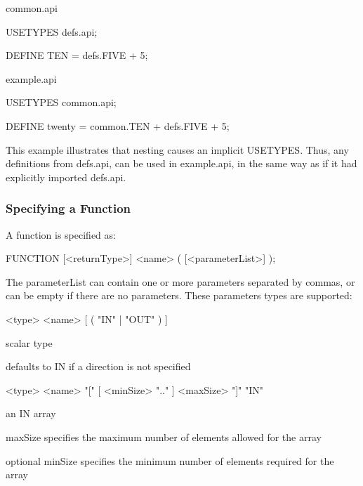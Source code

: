 common.\+api \begin{DoxyVerb}USETYPES defs.api;

DEFINE TEN = defs.FIVE + 5;
\end{DoxyVerb}


example.\+api \begin{DoxyVerb}USETYPES common.api;

DEFINE twenty = common.TEN + defs.FIVE + 5;
\end{DoxyVerb}


This example illustrates that nesting causes an implicit U\+S\+E\+T\+Y\+P\+E\+S. Thus, any definitions from defs.\+api, can be used in example.\+api, in the same way as if it had explicitly imported defs.\+api.\hypertarget{interface_def_lang_syntax_interfaceDefLangSyntax_function}{}\subsubsection{Specifying a Function}\label{interface_def_lang_syntax_interfaceDefLangSyntax_function}
A function is specified as\+:

\begin{DoxyVerb}FUNCTION [<returnType>] <name>
(
    [<parameterList>]
);
\end{DoxyVerb}


The {\ttfamily parameter\+List} can contain one or more parameters separated by commas, or can be empty if there are no parameters. These parameters types are supported\+:


\begin{DoxyCode}
<type> <name> [ ( \textcolor{stringliteral}{"IN"} | \textcolor{stringliteral}{"OUT"} ) ] 
\end{DoxyCode}

\begin{DoxyItemize}
\item scalar type
\item defaults to I\+N if a direction is not specified
\end{DoxyItemize}


\begin{DoxyCode}
<type> <name> \textcolor{stringliteral}{"["} [ <minSize> \textcolor{stringliteral}{".."} ] <maxSize> \textcolor{stringliteral}{"]"} \textcolor{stringliteral}{"IN"} 
\end{DoxyCode}

\begin{DoxyItemize}
\item an I\+N array
\item {\ttfamily max\+Size} specifies the maximum number of elements allowed for the array
\item optional {\ttfamily min\+Size} specifies the minimum number of elements required for the array
\end{DoxyItemize}


